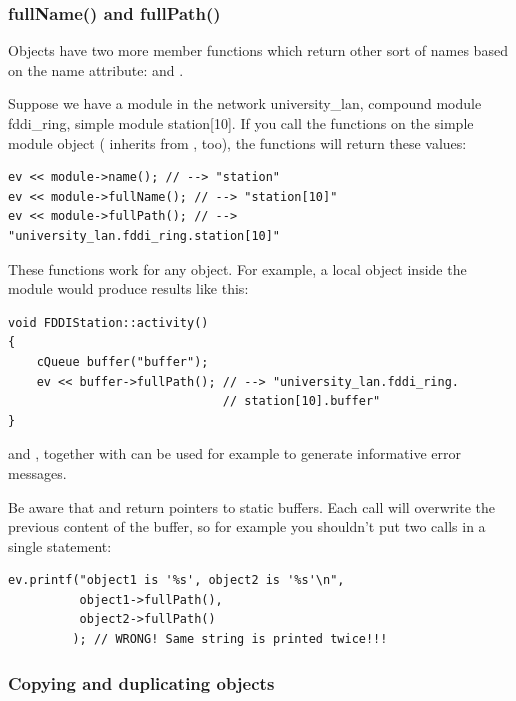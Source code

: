 \subsubsection{fullName() and fullPath()}


Objects have two more member functions which return other sort
of names based on the name attribute:  and .

Suppose we have a module in the network university\_lan, compound
module fddi\_ring, simple module station[10]. If you call the functions
on the simple module object ( inherits from
, too), the functions will return these values:

\begin{verbatim}
ev << module->name(); // --> "station"
ev << module->fullName(); // --> "station[10]"
ev << module->fullPath(); // --> "university_lan.fddi_ring.station[10]"
\end{verbatim}



These functions work for any object. For example, a local object
inside the module would produce results like this:


\begin{verbatim}
void FDDIStation::activity()
{
    cQueue buffer("buffer");
    ev << buffer->fullPath(); // --> "university_lan.fddi_ring.
                              // station[10].buffer"
}
\end{verbatim}



 and , together with
 can be used for example to generate informative
error messages.

Be aware that  and  return
pointers to static buffers. Each call will overwrite the previous
content of the buffer, so for example you shouldn't put two calls in a
single  statement:

\begin{verbatim}
ev.printf("object1 is '%s', object2 is '%s'\n",
          object1->fullPath(),
          object2->fullPath()
         ); // WRONG! Same string is printed twice!!!
\end{verbatim}


\subsubsection{Copying and duplicating objects}


